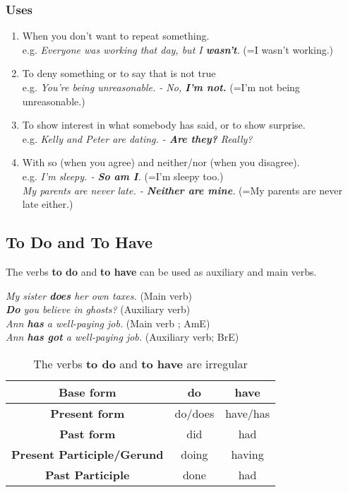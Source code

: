 \documentclass[hidelinks,10pt,a4paper]{article}
\begin{document}
\subsubsection{Uses}
\begin{enumerate}[label=(\alph*)]
	\item When you don't want to repeat something. \\
		e.g. \textit{Everyone was working that day, but I \textbf{wasn't}.} (=I wasn't working.)
	\item To deny something or to say that is not true \\
		e.g. \textit{You're being unreasonable. - No, \textbf{I'm not.}} (=I'm not being unreasonable.)
	\item To show interest in what somebody has said, or to show surprise. \\
		e.g. \textit{Kelly and Peter are dating. - \textbf{Are they?} Really?}
	\item With so (when you agree) and neither/nor (when you disagree). \\
		e.g. \textit{I'm sleepy. - \textbf{So am I}.} (=I'm sleepy too.) \\
		\textit{My parents are never late. - \textbf{Neither are mine}.} (=My parents are never late either.)
\end{enumerate}

\subsection{To Do and To Have}
The verbs \textbf{to do} and \textbf{to have} can be used as auxiliary and main verbs.

\begin{center}
	\textit{My sister \textbf{does} her own taxes.} (Main verb) \\
	\textit{\textbf{Do} you believe in ghosts?} (Auxiliary verb)  \\
	\textit{Ann \textbf{has} a well-paying job.} (Main verb ; AmE) \\
	\textit{Ann \textbf{has got} a well-paying job.} (Auxiliary verb; BrE)
\end{center}

\begin{table}[h]
\begin{center}
\begin{tabular}{|c|c|c|}
	\hline
	\textbf{Base form} & do & have \\ \hline
	\textbf{Present form}  & do/does & have/has \\ \hline
	\textbf{Past form} & did & had \\ \hline
	\textbf{Present Participle/Gerund} & doing & having \\ \hline
	\textbf{Past Participle} & done & had \\ \hline
\end{tabular}
\end{center}
\caption{The verbs \textbf{to do} and \textbf{to have} are irregular} \label{tab:tdth1}
\end{table}
\end{document}
